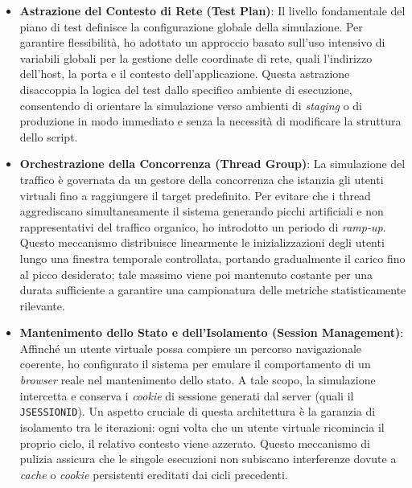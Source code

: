 \begin{itemize}
	\item \textbf{Astrazione del Contesto di Rete (Test Plan)}: Il livello fondamentale del piano di test definisce la configurazione globale della simulazione. Per garantire flessibilità, ho adottato un approccio basato sull'uso intensivo di variabili globali per la gestione delle coordinate di rete, quali l'indirizzo dell'host, la porta e il contesto dell'applicazione. Questa astrazione disaccoppia la logica del test dallo specifico ambiente di esecuzione, consentendo di orientare la simulazione verso ambienti di \textit{staging} o di produzione in modo immediato e senza la necessità di modificare la struttura dello script.

	\item \textbf{Orchestrazione della Concorrenza (Thread Group)}: La simulazione del traffico è governata da un gestore della concorrenza che istanzia gli utenti virtuali fino a raggiungere il target predefinito. Per evitare che i thread aggrediscano simultaneamente il sistema generando picchi artificiali e non rappresentativi del traffico organico, ho introdotto un periodo di \textit{ramp-up}. Questo meccanismo distribuisce linearmente le inizializzazioni degli utenti lungo una finestra temporale controllata, portando gradualmente il carico fino al picco desiderato; tale massimo viene poi mantenuto costante per una durata sufficiente a garantire una campionatura delle metriche statisticamente rilevante.

	\item \textbf{Mantenimento dello Stato e dell'Isolamento (Session Management)}: Affinché un utente virtuale possa compiere un percorso navigazionale coerente, ho configurato il sistema per emulare il comportamento di un \textit{browser} reale nel mantenimento dello stato. A tale scopo, la simulazione intercetta e conserva i \textit{cookie} di sessione generati dal server (quali il \texttt{JSESSIONID}). Un aspetto cruciale di questa architettura è la garanzia di isolamento tra le iterazioni: ogni volta che un utente virtuale ricomincia il proprio ciclo, il relativo contesto viene azzerato. Questo meccanismo di pulizia assicura che le singole esecuzioni non subiscano interferenze dovute a \textit{cache} o \textit{cookie} persistenti ereditati dai cicli precedenti.


\end{itemize}
